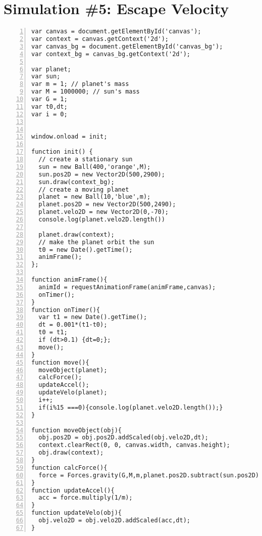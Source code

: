 \section{Simulation \#5:  Escape Velocity}
\begin{lstlisting}[breaklines=true, frame=single, numbers=left, caption=Escape Velocity Simulation]
var canvas = document.getElementById('canvas');
var context = canvas.getContext('2d'); 
var canvas_bg = document.getElementById('canvas_bg');
var context_bg = canvas_bg.getContext('2d');

var planet;
var sun;
var m = 1; // planet's mass
var M = 1000000; // sun's mass
var G = 1;
var t0,dt;
var i = 0;


window.onload = init; 

function init() {
  // create a stationary sun
  sun = new Ball(400,'orange',M);
  sun.pos2D = new Vector2D(500,2900); 
  sun.draw(context_bg);
  // create a moving planet     
  planet = new Ball(10,'blue',m);
  planet.pos2D = new Vector2D(500,2490);
  planet.velo2D = new Vector2D(0,-70);
  console.log(planet.velo2D.length())

  planet.draw(context);
  // make the planet orbit the sun
  t0 = new Date().getTime(); 
  animFrame();
};

function animFrame(){
  animId = requestAnimationFrame(animFrame,canvas);
  onTimer(); 
}
function onTimer(){
  var t1 = new Date().getTime(); 
  dt = 0.001*(t1-t0); 
  t0 = t1;  
  if (dt>0.1) {dt=0;};  
  move();
}
function move(){      
  moveObject(planet);
  calcForce();
  updateAccel();
  updateVelo(planet);
  i++;
  if(i%15 ===0){console.log(planet.velo2D.length());}
}

function moveObject(obj){
  obj.pos2D = obj.pos2D.addScaled(obj.velo2D,dt); 
  context.clearRect(0, 0, canvas.width, canvas.height);
  obj.draw(context);  
}
function calcForce(){
  force = Forces.gravity(G,M,m,planet.pos2D.subtract(sun.pos2D)); 
} 
function updateAccel(){
  acc = force.multiply(1/m);
} 
function updateVelo(obj){
  obj.velo2D = obj.velo2D.addScaled(acc,dt);        
}
\end{lstlisting}


